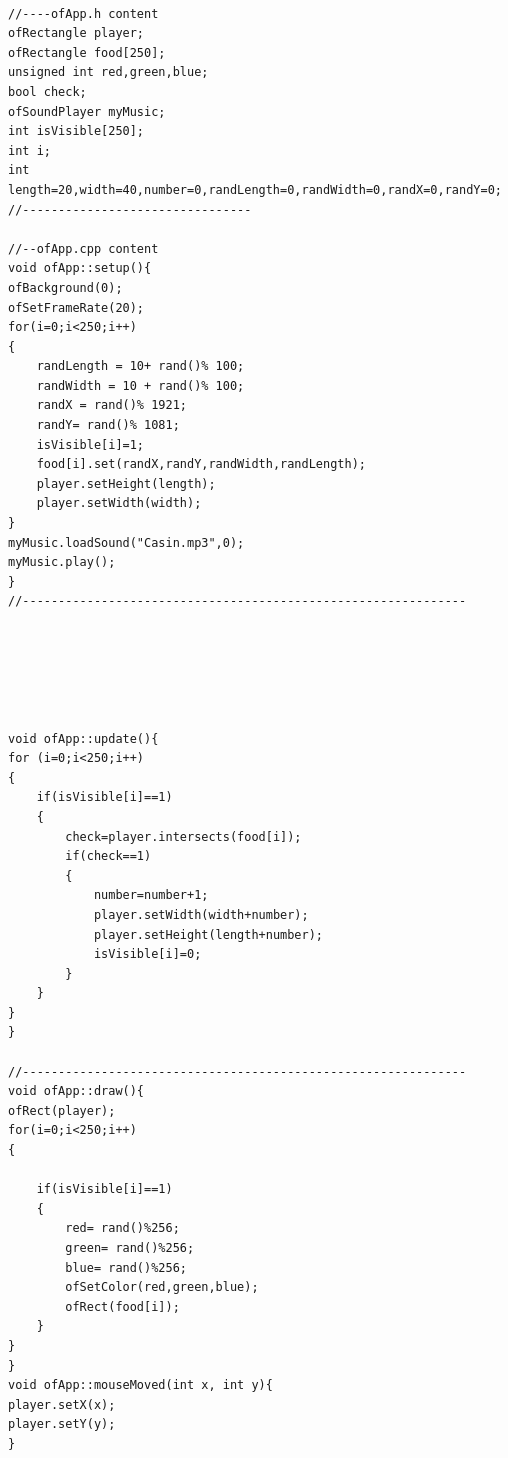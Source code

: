 \documentclass[letterpaper, 24pt, final, onecolumn, titlepage] {article}
\begin{document}
\begin{lstlisting}

//----ofApp.h content
ofRectangle player;
ofRectangle food[250];
unsigned int red,green,blue;
bool check;
ofSoundPlayer myMusic;
int isVisible[250];
int i;
int length=20,width=40,number=0,randLength=0,randWidth=0,randX=0,randY=0;
//--------------------------------

//--ofApp.cpp content
void ofApp::setup(){
ofBackground(0);
ofSetFrameRate(20);
for(i=0;i<250;i++)
{
    randLength = 10+ rand()% 100;
    randWidth = 10 + rand()% 100;
    randX = rand()% 1921;
    randY= rand()% 1081;
    isVisible[i]=1;
    food[i].set(randX,randY,randWidth,randLength);
    player.setHeight(length);
    player.setWidth(width);
}
myMusic.loadSound("Casin.mp3",0);
myMusic.play();
}
//--------------------------------------------------------------






void ofApp::update(){
for (i=0;i<250;i++)
{
    if(isVisible[i]==1)
    {
        check=player.intersects(food[i]);
        if(check==1)
        {
            number=number+1;
            player.setWidth(width+number);
            player.setHeight(length+number);
            isVisible[i]=0;
        }
    }
}
}

//--------------------------------------------------------------
void ofApp::draw(){
ofRect(player);
for(i=0;i<250;i++)
{

    if(isVisible[i]==1)
    {
        red= rand()%256;
        green= rand()%256;
        blue= rand()%256;
        ofSetColor(red,green,blue);
        ofRect(food[i]);
    }
}
}
void ofApp::mouseMoved(int x, int y){
player.setX(x);
player.setY(y);
}
\end{lstlisting}
\end{document}
